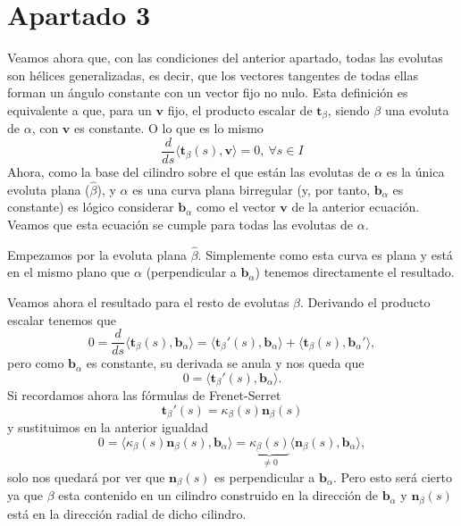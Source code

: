 \section{Apartado 3}
Veamos ahora que, con las condiciones del anterior apartado, todas las evolutas
son hélices generalizadas, es decir, que los vectores tangentes de todas ellas
forman un ángulo constante con un vector fijo no nulo. Esta definición es
equivalente a que, para un $\mathbf{v}$ fijo, el producto escalar de
$\mathbf{t}_{\beta}$, siendo $\beta$ una evoluta de $\alpha$, con $\mathbf{v}$
es constante. O lo que es lo mismo
\[
    \frac{d}{ds}\langle \mathbf{t}_{\beta}\left( s \right), \mathbf{v} \rangle
    = 0,\ \forall s \in I
\]
Ahora, como la base del cilindro sobre el que están las evolutas de $\alpha$ es
la única evoluta plana ($\hat{\beta}$), y $\alpha$ es una curva
plana birregular (y, por tanto, $\mathbf{b}_{\alpha}$ es constante) es lógico considerar
$\mathbf{b}_{\alpha}$ como el vector $\mathbf{v}$ de la anterior ecuación.
Veamos que esta ecuación se cumple para todas las evolutas de $\alpha$.

Empezamos por la evoluta plana $\hat{\beta}$. Simplemente como esta curva es
plana y está en el mismo plano que $\alpha$ (perpendicular a
$\mathbf{b}_{\alpha}$) tenemos directamente el resultado.

Veamos ahora el resultado para el resto de evolutas $\beta$. Derivando el
producto escalar tenemos que
\[
0 = \frac{d}{ds}\langle \mathbf{t}_{\beta}\left( s \right),
\mathbf{b}_{\alpha} \rangle = \langle
\mathbf{t}_{\beta}'\left( s \right), \mathbf{b}_{\alpha} \rangle
+ \langle \mathbf{t}_{\beta}\left( s \right),
\mathbf{b}_{\alpha}' \rangle,
\]
pero como $\mathbf{b}_{\alpha}$ es constante, su derivada se anula y nos queda
que
\[
0 = \langle \mathbf{t}_{\beta}'\left( s \right), \mathbf{b}_{\alpha} \rangle.
\]
Si recordamos ahora las fórmulas de Frenet-Serret
\[
\mathbf{t}_{\beta}'\left( s \right) = \kappa_{\beta}\left( s \right)\mathbf{n}_{\beta}\left( s \right)
\]
y sustituimos en la anterior igualdad
\[
0 = \langle \kappa_{\beta}\left( s \right)\mathbf{n}_{\beta}\left( s \right),
\mathbf{b}_{\alpha} \rangle = \underbrace{\kappa_{\beta}\left( s \right)}_{\neq 0}\langle
\mathbf{n}_{\beta}\left( s \right), \mathbf{b}_{\alpha} \rangle,
\]
solo nos quedará por ver que $\mathbf{n}_{\beta}\left( s \right)$ es
perpendicular a $\mathbf{b}_{\alpha}$. Pero esto será cierto ya que $\beta$ esta
contenido en un cilindro construido en la dirección de $\mathbf{b}_{\alpha}$ y
$\mathbf{n}_{\beta}\left( s \right)$ está en la dirección radial de dicho
cilindro.
